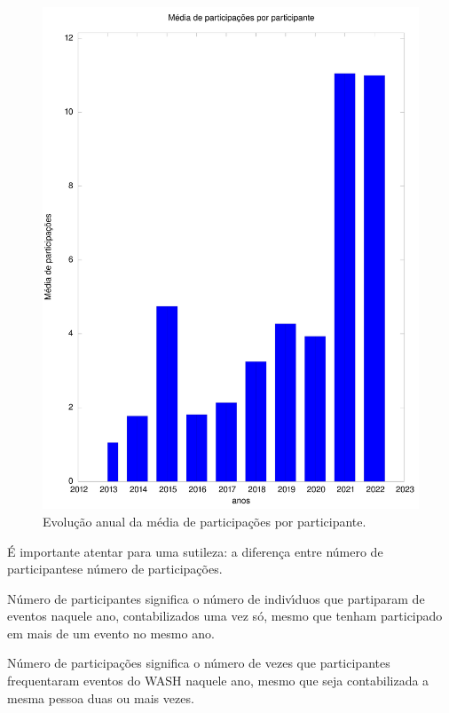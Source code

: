 \documentclass[
12pt,		%
openright,	%
twoside,  %
a4paper,			%
chapter=TITLE,		%
english,			%
french,				%
spanish,			%
brazil				%
]{USPSC-classe/USPSC}
\begin{document}
\begin{figure}[max size={\textwidth}{\textheight}]
\begin{minipage}[b]{0.4\linewidth}
                \includegraphics[width=1.0\linewidth]{../../imagens/output-media-participacoes.jpeg}
                \caption{Evolu\c{c}\~ao anual da m\'edia de participa\c{c}\~oes por participante.}
                \label{a8f2d72073b88290f9b8731b144383d2f7c4dc4b}
\end{minipage}%
\hspace{0.5cm}
\end{figure}



\'E importante atentar para uma sutileza: a diferen\c{c}a entre \textquotedbl n\'umero de participantes\textquotedbl  e \textquotedbl n\'umero de participa\c{c}\~oes\textquotedbl .


N\'umero de participantes significa o n\'umero de indiv\'{\i}duos que partiparam de eventos naquele ano, contabilizados uma vez s\'o, mesmo que tenham participado em mais de um evento no mesmo ano.


N\'umero de participa\c{c}\~oes significa o n\'umero de vezes que participantes frequentaram eventos do WASH naquele ano, mesmo que seja contabilizada a mesma pessoa duas ou mais vezes.
\end{document}
